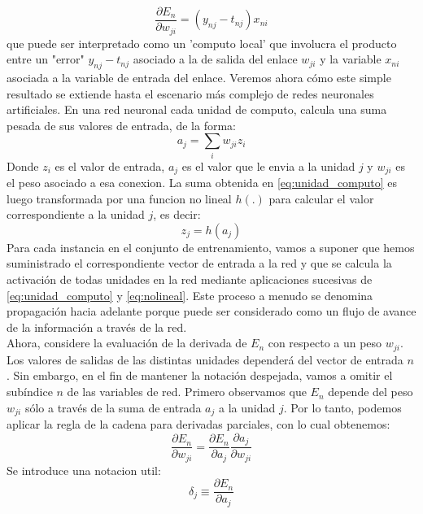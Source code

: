 \documentclass[a4paper,11pt,spanish]{book}
\begin{document}
	\begin{equation*}
	  \frac{\partial E_n}{\partial w_{ji}} = (y_{nj} − t_{nj}) x_{ni}
	\end{equation*}
	que puede ser interpretado como un 'computo local' que involucra el producto entre un "error" $y_{nj} − t_{nj}$ asociado a la de salida del enlace $w_{ji}$ y la variable $x_{ni}$ 
	asociada a la variable de entrada del enlace.
	Veremos ahora cómo este simple resultado se extiende hasta el escenario más complejo de redes neuronales artificiales.
	\fi
	En una red neuronal cada unidad de computo, calcula una suma pesada de sus valores de entrada, de la forma:
	\begin{equation} \label{eq:unidad_computo}
	  a_j = \sum_{i} w_{ji} z_i
	\end{equation}
	Donde $z_i$ es el valor de entrada, $a_j$ es el valor que le envia a la unidad $j$ y $w_{ji}$ es el peso asociado a esa conexion.
	La suma obtenida en \eqref{eq:unidad_computo} es luego transformada por una funcion no lineal $h(.)$ para calcular el valor correspondiente a la unidad $j$, es decir:
	\begin{equation}\label{eq:nolineal}
	  z_j = h(a_j)
	\end{equation}
	Para cada instancia en el conjunto de entrenamiento, vamos a suponer que hemos suministrado el correspondiente vector de entrada a la red y que se calcula la activación 
	de todas unidades en la red mediante aplicaciones sucesivas de \eqref{eq:unidad_computo} y \eqref{eq:nolineal}. Este proceso a menudo se denomina 
	propagación hacia adelante porque puede ser considerado como un flujo de avance de la información a través de la red.\\
	Ahora, considere la evaluación de la derivada de $E_n$ con respecto a un peso $w_{ji}$. Los valores de salidas de las distintas unidades dependerá del vector de entrada $n$. 
	Sin embargo, en el fin de mantener la notación despejada, vamos a omitir el subíndice $n$ de las variables de red. Primero observamos que $E_n$ depende del peso $w_{ji}$ 
	sólo a través de la suma de entrada $a_j$ a la unidad $j$. Por lo tanto, podemos aplicar la regla de la cadena para derivadas parciales, con lo cual obtenemos:
	\begin{equation} \label{eq:partial_derivatives}
	  \frac{\partial E_n}{\partial w_{ji}} = \frac{\partial E_n}{\partial a_j} \frac{\partial a_j}{\partial w_{ji}}
	\end{equation}
	Se introduce una notacion util:
	\begin{equation} \label{eq:notation}
	  \delta_j \equiv \frac{\partial E_n}{\partial a_j}
	\end{equation}
\end{document}
